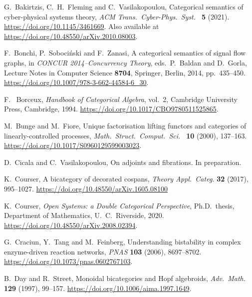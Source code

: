 \documentclass[ a4paper, onecolumn, superscriptaddress,10pt, accepted=2022-02-14, issue=3, volume=4, shorttitle=papers/compositionality-4-3 ]{compositionalityarticle}
\begin{document}
\begin{thebibliography}{100}
 G.\ Bakirtzis, C.\ H.\ Fleming and C.\ Vasilakopoulou, Categorical semantics of cyber-physical systems theory, \textsl{ACM Trans.\
Cyber-Phys.\ Syst.\ } \textbf{5} (2021). \href{https://doi.org/10.1145/3461669}{https://doi.org/10.1145/3461669}.   Also available at \href{https://doi.org/10.48550/arXiv.2010.08003}{https://doi.org/10.48550/arXiv.2010.08003}.

 F.\ Bonchi, P.\ Soboci\'nski and F.\ Zanasi, A categorical semantics of signal flow graphs, in \textsl{CONCUR 2014--Concurrency Theory},
eds.\ P.\ Baldan and D.\ Gorla, Lecture Notes in Computer Science \textbf{8704}, Springer, Berlin, 2014, pp.\ 435--450.
\href{https://doi.org/10.1007/978-3-662-44584-6\_30}{https://doi.org/10.1007/978-3-662-44584-6\_30}.

 F. \ Borceux, \textsl{Handbook of Categorical Algebra}, vol.\ 2,
Cambridge University Press, Cambridge, 1994. \href{https://doi.org/10.1017/CBO9780511525865}{https://doi.org/10.1017/CBO9780511525865}.

 M.\ Bunge and M.\ Fiore, Unique factorisation lifting functors and categories of linearly-controlled processes, \textsl{Math.\
Struct.\ Comput.\ Sci.\ } \textbf{10} (2000), 137--163. \hfill \break
\href{https://doi.org/10.1017/S0960129599003023}{https://doi.org/10.1017/S0960129599003023}.

\bibitem{CV} D.\ Cicala and C.\ Vasilakopoulou, On adjoints and fibrations. In preparation.

\bibitem{Courser} K.\ Courser, A bicategory of decorated cospans, \textsl{Theory Appl.\ Categ.} \textbf{32} (2017), 995--1027.  \href{https://doi.org/10.48550/arXiv.1605.08100}{https://doi.org/10.48550/arXiv.1605.08100}

\bibitem{CourserThesis} K.\ Courser, \textsl{Open Systems: a Double Categorical Perspective}, Ph.D.\ thesis, Department of Mathematics, U.\ C.\ Riverside, 2020.
\href{https://doi.org/10.48550/arXiv.2008.02394}{https://doi.org/10.48550/arXiv.2008.02394}.

\bibitem{CTF} G.\ Craciun, Y.\ Tang and M.\ Feinberg, Understanding bistability in complex enzyme-driven reaction networks, \textsl{PNAS} \textbf{103}
(2006), 8697--8702. \href{https://doi.org/10.1073/pnas.0602767103}{https://doi.org/10.1073/pnas.0602767103}.

\bibitem{DS} B.\ Day and R.\ Street, Monoidal bicategories and Hopf algebroids, \textsl{Adv.\ Math.} \textbf{129} (1997), 99--157.
\href{https://doi.org/10.1006/aima.1997.1649}{https://doi.org/10.1006/aima.1997.1649}.


\end{thebibliography}
\end{document}
